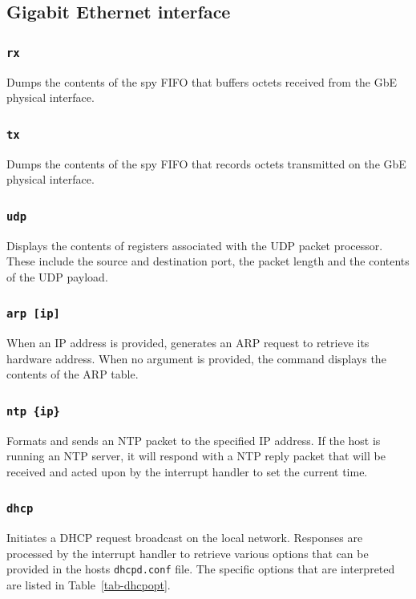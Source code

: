 \documentclass[11pt]{article}
\begin{document}
\subsection{Gigabit Ethernet interface}
\subsubsection{\tt rx}
Dumps the contents of the spy FIFO that buffers octets received from
the GbE physical interface.

\subsubsection{\tt tx}
Dumps the contents of the spy FIFO that records octets transmitted on
the GbE physical interface.

\subsubsection{\tt udp}
Displays the contents of registers associated with the UDP packet
processor.  These include the source and destination port, the packet
length and the contents of the UDP payload.

\subsubsection{\tt arp [ip]}
When an IP address is provided, generates an ARP request to retrieve its
hardware address.  When no argument is provided, the command displays
the contents of the ARP table.

\subsubsection{\tt ntp \{ip\}}
Formats and sends an NTP packet to the specified IP address.  If the host
is running an NTP server, it will respond with a NTP reply packet that
will be received and acted upon by the interrupt handler to set the
current time.

\subsubsection{\tt dhcp}
Initiates a DHCP request broadcast on the local network.  Responses are
processed by the interrupt handler to retrieve various options that can
be provided in the hosts {\tt dhcpd.conf} file.  The specific options
that are interpreted are listed in Table~\ref{tab-dhcpopt}.
\end{document}
